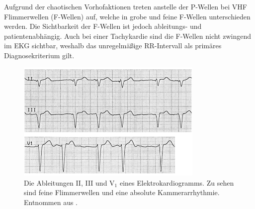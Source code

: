 Aufgrund der chaotischen Vorhofaktionen treten anstelle der P-Wellen bei \gls{VHF} Flimmerwellen (F-Wellen) auf, welche in grobe und feine F-Wellen unterschieden werden. Die Sichtbarkeit der F-Wellen ist jedoch ableitungs- und patientenabhängig. Auch bei einer Tachykardie sind die F-Wellen nicht zwingend im \gls{EKG} sichtbar, weshalb das unregelmäßige RR-Intervall als primäres Diagnosekriterium gilt.  \cite{gertsch_ekg_2007}

\begin{figure}[!ht]%
\centering
	\includegraphics[width=0.80\textwidth]{./Bilder/VHFEKG_fein.png}
\caption[VHF im EKG]{Die Ableitungen II, III und V$_1$ eines Elektrokardiogramms. Zu sehen sind feine Flimmerwellen und eine absolute Kammerarrhythmie. Entnommen aus  \cite{gertsch_ekg_2007}.} 
\label{fig:EKG_afib}
\end{figure} 


